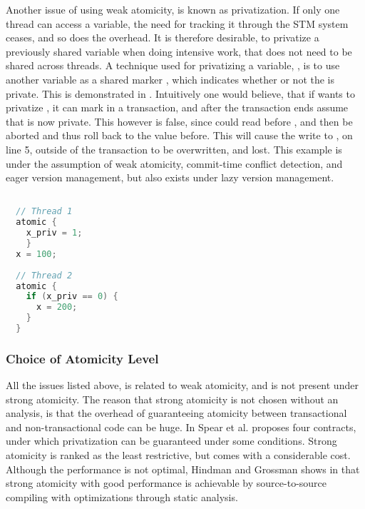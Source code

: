 Another issue of using weak atomicity, is known as privatization. If only one thread can access a variable, the need for tracking it through the \ac{STM} system ceases, and so does the overhead. It is therefore desirable, to privatize a previously shared variable when doing intensive work, that does not need to be shared across threads. A technique used for privatizing a variable, , is to use another variable as a shared marker , which indicates whether or not the  is private. This is demonstrated in . Intuitively one would believe, that if  wants to privatize , it can mark  in a transaction, and after the transaction ends assume that  is now private. This however is false, since  could read  before , and then be aborted and thus roll  back to the value before. This will cause the write to , on line 5, outside of the transaction to be overwritten, and lost. This example is under the assumption of weak atomicity, commit-time conflict detection, and eager version management, but also exists under lazy version management\cite[p. 34]{harris2010transactional}. 

\begin{lstlisting}[label=lst:privatization,
  caption={Privatization issue},
  language=Java,  
  showspaces=false,
  showtabs=false,
  breaklines=true,
  showstringspaces=false,
  breakatwhitespace=true,
  commentstyle=\color{greencomments},
  keywordstyle=\color{bluekeywords},
  stringstyle=\color{redstrings},
  morekeywords={atomic, retry, orElse, var, get, set}]  % Start your code-block

  // Thread 1
  atomic {
    x_priv = 1;
    }
  x = 100;
  
  // Thread 2
  atomic {
    if (x_priv == 0) {
      x = 200;
    }
  }
\end{lstlisting}


\subsubsection{Choice of Atomicity Level}
All the issues listed above, is related to weak atomicity, and is not present under strong atomicity. The reason that strong atomicity is not chosen without an analysis, is that the overhead of guaranteeing atomicity between transactional and non-transactional code can be huge\cite{spear2007privatization}. In \cite{spear2007privatization} Spear et al. proposes four contracts, under which privatization can be guaranteed under some conditions. Strong atomicity is ranked as the least restrictive, but comes with a considerable cost. Although the performance is not optimal, Hindman and Grossman shows in \cite{hindman2006atomicity} that strong atomicity with good performance is achievable by source-to-source compiling with optimizations through static analysis.

